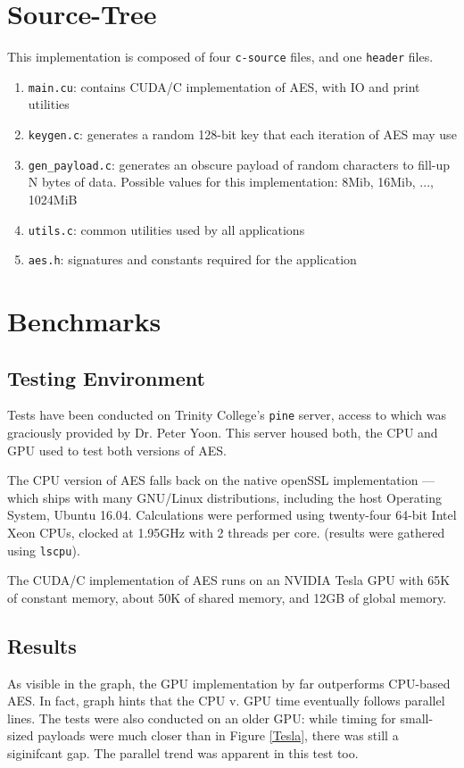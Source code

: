 \documentclass[letterpaper,twocolumn,10pt]{article}
\begin{document}
\section{Source-Tree}
This implementation is composed of four \texttt{c-source} files, and one \texttt{header} files.
\begin{enumerate}
    \item \texttt{main.cu}: contains CUDA/C implementation of AES, with IO and print utilities
    \item \texttt{keygen.c}: generates a random 128-bit key that each iteration of AES may use
    \item \texttt{gen\_payload.c}: generates an obscure payload of random characters to fill-up N bytes of data. Possible values for this implementation: 8Mib, 16Mib, $...$, 1024MiB
    \item \texttt{utils.c}: common utilities used by all applications
    \item \texttt{aes.h}: signatures and constants required for the application
\end{enumerate}

\section{Benchmarks}
\subsection{Testing Environment}
Tests have been conducted on Trinity College's \texttt{pine} server, access to which was graciously provided by Dr. Peter Yoon. This server housed both, the CPU and GPU used to test both versions of AES.

The CPU version of AES falls back on the native openSSL implementation --- which ships with many GNU/Linux distributions, including the host Operating System, Ubuntu 16.04. Calculations were performed using twenty-four 64-bit Intel Xeon CPUs, clocked at 1.95GHz with 2 threads per core. (results were gathered using \texttt{lscpu}).

The CUDA/C implementation of AES runs on an NVIDIA Tesla GPU with 65K of constant memory, about 50K of shared memory, and 12GB of global memory. 

\subsection{Results}
As visible in the graph, the GPU implementation by far outperforms CPU-based AES. In fact, graph hints that the CPU v. GPU time eventually follows parallel lines. The tests were also conducted on an older GPU: while timing for small-sized payloads were much closer than in Figure \ref{Tesla}, there was still a siginifcant gap. The parallel trend was apparent in this test too.
\end{document}
